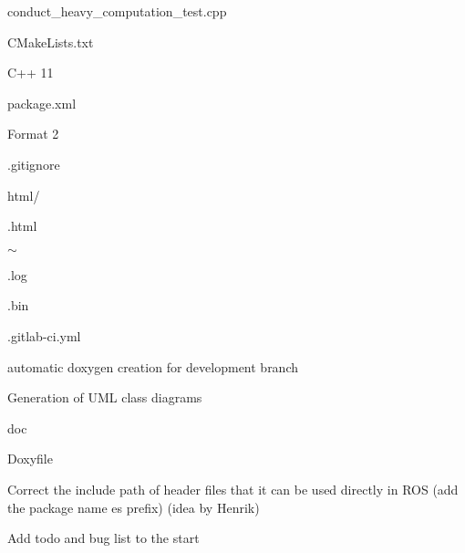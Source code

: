 \begin{DoxyEnumerate}
\begin{DoxyEnumerate}
\begin{DoxyEnumerate}
\begin{DoxyEnumerate}
\begin{DoxyEnumerate}
\item conduct\+\_\+heavy\+\_\+computation\+\_\+test.\+cpp
\end{DoxyEnumerate}
\end{DoxyEnumerate}
\end{DoxyEnumerate}
\begin{DoxyEnumerate}
\item C\+Make\+Lists.\+txt
\begin{DoxyItemize}
\item C++ 11
\end{DoxyItemize}
\end{DoxyEnumerate}
\begin{DoxyEnumerate}
\item package.\+xml
\begin{DoxyItemize}
\item Format 2
\end{DoxyItemize}
\end{DoxyEnumerate}
\end{DoxyEnumerate}
\begin{DoxyEnumerate}
\item .gitignore
\begin{DoxyItemize}
\item html/
\item .html
\item $\sim$
\item .log
\item .bin
\end{DoxyItemize}
\end{DoxyEnumerate}
\begin{DoxyEnumerate}
\item .gitlab-\/ci.\+yml
\begin{DoxyItemize}
\item automatic doxygen creation for development branch
\item Generation of U\+ML class diagrams
\end{DoxyItemize}
\end{DoxyEnumerate}
\begin{DoxyEnumerate}
\item doc
\begin{DoxyEnumerate}
\item Doxyfile
\begin{DoxyItemize}
\item Correct the include path of header files that it can be used directly in R\+OS (add the package name es prefix) (idea by Henrik)
\item Add todo and bug list to the start
\end{DoxyItemize}
\end{DoxyEnumerate}
\end{DoxyEnumerate}
\end{DoxyEnumerate}
